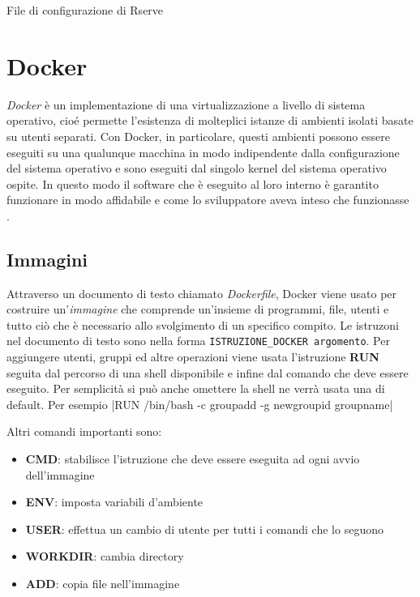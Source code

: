 \documentclass[10pt,titlepage,twoside,a4paper]{report}
\newenvironment{code}{\singlespacing\captionsetup{type=listing}}{}
\begin{document}
\begin{code}
    \caption{File di configurazione di Rserve}
    \label{lst:rservconf}
\end{code}


    \section{Docker}
\emph{Docker} è un implementazione di una virtualizzazione a 
livello di sistema operativo, cioé permette l'esistenza di molteplici istanze 
di ambienti isolati basate su utenti separati. Con Docker, in particolare, 
questi ambienti possono essere eseguiti su una qualunque macchina in modo 
indipendente dalla configurazione del sistema operativo e sono eseguiti dal 
singolo kernel del sistema operativo ospite. In questo modo il software che è 
eseguito al loro interno è garantito funzionare in modo affidabile e come lo 
sviluppatore aveva inteso che funzionasse
\cite{operatingSystemLevelVirtualization} \cite{docker}.

        \subsection{Immagini}
Attraverso un documento di testo chiamato \emph{Dockerfile}, Docker viene 
usato per costruire un'\emph{immagine} che comprende un'insieme di 
programmi, file, utenti e tutto ciò che è necessario allo svolgimento di
un specifico compito. Le istruzoni nel documento di testo sono nella forma
\texttt{ISTRUZIONE_DOCKER argomento}. Per aggiungere utenti, 
gruppi ed altre operazioni viene usata l'istruzione \textbf{RUN} seguita dal 
percorso di una shell disponibile e infine dal comando che deve essere eseguito. Per 
semplicità si può anche omettere la shell ne verrà usata una di default. Per 
esempio
|RUN /bin/bash -c groupadd -g newgroupid groupname|

Altri comandi importanti sono:
\begin{itemize}
    \item \textbf{CMD}: stabilisce l'istruzione che deve essere 
eseguita ad ogni avvio dell'immagine
    \item \textbf{ENV}: imposta variabili d'ambiente
    \item \textbf{USER}: effettua un cambio di utente per tutti i comandi che lo seguono
    \item \textbf{WORKDIR}: cambia directory
    \item \textbf{ADD}: copia file nell'immagine
\end{itemize}
\end{document}
